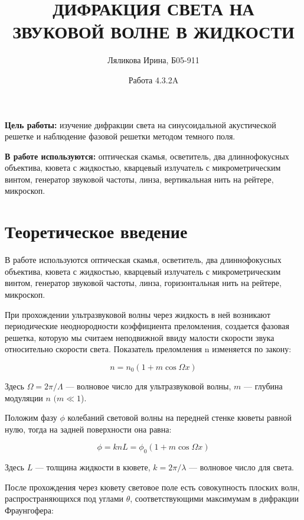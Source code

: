 \documentclass[a4paper,12pt]{article}
\title{ДИФРАКЦИЯ СВЕТА НА ЗВУКОВОЙ ВОЛНЕ В ЖИДКОСТИ}
\date{Работа 4.3.2A}
\author{Ляликова Ирина, Б05-911}
\begin{document}
		\vspace{0.5 cm}
	\maketitle
	\vspace{0.5 cm}
	
	\textbf{Цель работы:} изучение дифракции света на синусоидальной акустической решетке и наблюдение фазовой решетки методом темного поля.
	
	\textbf{В работе используются:} оптическая скамья, осветитель, два длиннофокусных объектива, кювета с жидкостью, кварцевый излучатель с микрометрическим винтом, генератор звуковой частоты, линза, вертикальная нить на рейтере, микроскоп.
	
	\section*{Теоретическое введение}
	
	В работе используются оптическая скамья, осветитель, два длиннофокусных объектива, кювета с жидкостью, кварцевый излучатель с микрометрическим винтом, генератор звуковой частоты, линза, горизонтальная нить на рейтере, микроскоп. 
	
	При прохождении ультразвуковой волны через жидкость в ней возникают периодические неоднородности коэффициента преломления, создается фазовая решетка, которую мы считаем неподвижной ввиду малости скорости звука относительно скорости света. Показатель
	преломления n изменяется по закону:
	
	\begin{equation}\label{}
	n = n_0 (1 + m \cos \Omega x)
	\end{equation}
	
	Здесь $ \Omega = 2 \pi / \Lambda $ --- волновое число для ультразвуковой волны, $ m $ --- глубина модуляции $ n $ $ (m \ll 1 $).
	
	Положим фазу $ \phi $ колебаний световой волны на передней стенке кюветы равной нулю, тогда на задней поверхности она равна:
	
	\begin{equation}\label{}
	\phi  = k n L = \phi_0 (1 + m \cos \Omega x)
	\end{equation}
	
	Здесь $ L $ --- толщина жидкости в кювете, $ k = 2 \pi / \lambda $ --- волновое число для света.
	
	После прохождения через кювету световое поле есть совокупность плоских волн, распространяющихся под углами $ \theta $, соответствующими максимумам в дифракции Фраунгофера:
	
\end{document}
